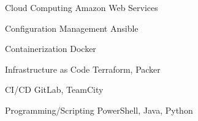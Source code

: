 \begin{cvskills}


\cvskill
{Cloud Computing} %
{ %
 Amazon Web Services
}


\cvskill
{Configuration Management} %
{ %
 Ansible
}


\cvskill
{Containerization} %
{ %
Docker
}


\cvskill
{Infrastructure as Code} %
{ %
  Terraform,
  Packer
}


\cvskill
{CI/CD} %
{ %
  GitLab,
  TeamCity
}


\cvskill
{Programming/Scripting} %
{ %
  PowerShell,
  Java,
  Python
}

\end{cvskills}

